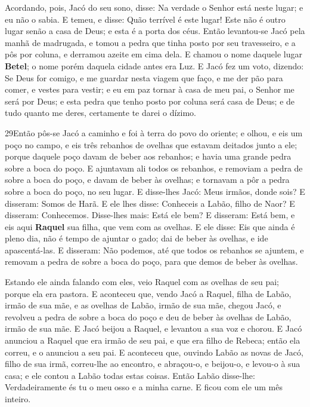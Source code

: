 Acordando, pois, Jacó do seu sono, disse: Na verdade o Senhor
está neste lugar; e eu não o sabia. E temeu, e disse: Quão
terrível é este lugar! Este não é outro lugar senão a casa de Deus;
e esta é a porta dos céus. Então levantou-se Jacó pela manhã
de madrugada, e tomou a pedra que tinha posto por seu travesseiro, e
a pôs por coluna, e derramou azeite em cima dela. E chamou o
nome daquele lugar \textbf{Betel}; o nome porém daquela cidade antes
era Luz. E Jacó fez um voto, dizendo: Se Deus for comigo, e
me guardar nesta viagem que faço, e me der pão para comer, e vestes
para vestir; e eu em paz tornar à casa de meu pai, o Senhor
me será por Deus; e esta pedra que tenho posto por coluna
será casa de Deus; e de tudo quanto me deres, certamente te darei o
dízimo.

\smallskip

\lettrine{29} Então pôs-se Jacó a caminho e foi à terra do
povo do oriente; e olhou, e eis um poço no campo, e eis três
rebanhos de ovelhas que estavam deitados junto a ele; porque daquele
poço davam de beber aos rebanhos; e havia uma grande pedra sobre a
boca do poço. E ajuntavam ali todos os rebanhos, e removiam a
pedra de sobre a boca do poço, e davam de beber às ovelhas; e
tornavam a pôr a pedra sobre a boca do poço, no seu lugar. E
disse-lhes Jacó: Meus irmãos, donde sois? E disseram: Somos de Harã.
E ele lhes disse: Conheceis a Labão, filho de Naor? E disseram:
Conhecemos. Disse-lhes mais: Está ele bem? E disseram: Está bem,
e eis aqui \textbf{Raquel} sua filha, que vem com as ovelhas. E
ele disse: Eis que ainda é pleno dia, não é tempo de ajuntar o gado;
dai de beber às ovelhas, e ide apascentá-las. E disseram: Não
podemos, até que todos os rebanhos se ajuntem, e removam a pedra de
sobre a boca do poço, para que demos de beber às ovelhas.

Estando ele ainda falando com eles, veio Raquel com as ovelhas de
seu pai; porque ela era pastora. E aconteceu que, vendo Jacó
a Raquel, filha de Labão, irmão de sua mãe, e as ovelhas de Labão,
irmão de sua mãe, chegou Jacó, e revolveu a pedra de sobre a boca do
poço e deu de beber às ovelhas de Labão, irmão de sua mãe. E
Jacó beijou a Raquel, e levantou a sua voz e chorou. E Jacó
anunciou a Raquel que era irmão de seu pai, e que era filho de
Rebeca; então ela correu, e o anunciou a seu pai. E aconteceu
que, ouvindo Labão as novas de Jacó, filho de sua irmã, correu-lhe
ao encontro, e abraçou-o, e beijou-o, e levou-o à sua casa; e ele
contou a Labão todas estas coisas. Então Labão disse-lhe:
Verdadeiramente és tu o meu osso e a minha carne. E ficou com ele um
mês inteiro.

